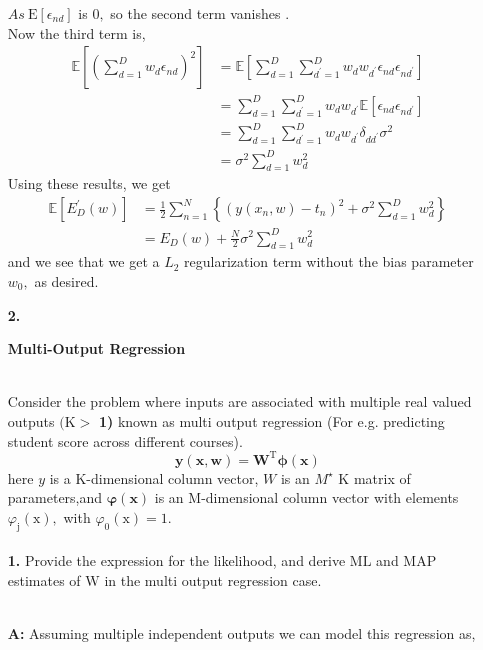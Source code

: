 \documentclass[english,a4paper,12pt]{article}
\begin{document}
\begin{enumerate}
$As \ \mathrm{E}\left[\epsilon_{n d}\right]$ is $0,$ so the second term vanishes
. 
\\Now the third term is,
$$
\begin{aligned}
\mathbb{E}\left[\left(\sum_{d=1}^{D} w_{d} \epsilon_{n d}\right)^{2}\right] &=\mathbb{E}\left[\sum_{d=1}^{D} \sum_{d^{\prime}=1}^{D} w_{d} w_{d^{\prime}} \epsilon_{n d} \epsilon_{n d^{\prime}}\right] \\
&=\sum_{d=1}^{D} \sum_{d^{\prime}=1}^{D} w_{d} w_{d^{\prime}} \mathbb{E}\left[\epsilon_{n d} \epsilon_{n d^{\prime}}\right] \\
&=\sum_{d=1}^{D} \sum_{d^{\prime}=1}^{D} w_{d} w_{d^{\prime}} \delta_{d d^{\prime}}\sigma^2 \\
&=\sigma^2\sum_{d=1}^{D} w_{d}^{2}
\end{aligned}
$$
Using these results, we get
$$
\begin{aligned}
\mathbb{E}\left[E_{D}^{\prime}(w)\right] &=\frac{1}{2} \sum_{n=1}^{N}\left\{\left(y\left(x_{n}, w\right)-t_{n}\right)^{2}+\sigma^2\sum_{d=1}^{D} w_{d}^{2}\right\} \\
&=E_{D}(w)+\frac{N}{2}\sigma^2 \sum_{d=1}^{D} w_{d}^{2} 
\end{aligned}
$$
and we see that we get a $L_{2}$ regularization term without the bias parameter $w_{0},$ as desired.
\newpage
\item[\textbf{2.}] {\begin{center}
       \large{\textbf{Multi-Output Regression}}  \\~\\
   \end{center}
Consider the problem where inputs are associated with multiple real valued outputs $(\mathrm{K}>$
\textbf{1)} known as multi output regression (For e.g. predicting student score across different courses).
$$
\mathbf{y}\left(\mathbf{x}, \mathbf{w}\right)=\mathbf{W}^{\mathrm{T}} \boldsymbol{\phi}(\mathbf{x})
$$
here $y$ is a K-dimensional column vector, $W$ is an $M^{\star}$ K matrix of parameters,and $\boldsymbol{\varphi(x)}$ is an M-dimensional column vector with elements $\varphi_\mathrm{j}(\mathrm{x}),$ with $\varphi_0(\mathrm{x})=1$. \\~\\
\textbf{1.} Provide the expression for the likelihood, and derive $\mathrm{ML}$ and MAP estimates of $\mathrm{W}$ in
the multi output regression case.
}\\
\textbf{A:}
Assuming multiple independent outputs we can model this regression as,\\

\end{enumerate}
\end{document}

